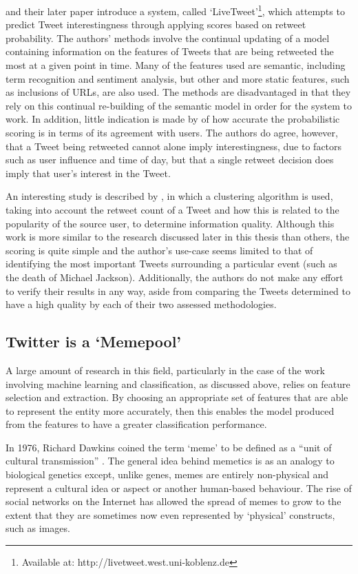 \citet{aldahi11} and their later paper \cite{aldahi12} introduce a system, called `LiveTweet'\footnote{Available at: http://livetweet.west.uni-koblenz.de}, which attempts to predict Tweet interestingness through applying scores based on retweet probability. The authors' methods involve the continual updating of a model containing information on the features of Tweets that are being retweeted the most at a given point in time. Many of the features used are semantic, including term recognition and sentiment analysis, but other and more static features, such as inclusions of URLs, are also used. The methods are disadvantaged in that they rely on this continual re-building of the semantic model in order for the system to work. In addition, little indication is made by \citet{aldahi12} of how accurate the probabilistic scoring is in terms of its agreement with users. The authors do agree, however, that a Tweet being retweeted cannot alone imply interestingness, due to factors such as user influence and time of day, but that a single retweet decision does imply that user's interest in the Tweet.

An interesting study is described by \citet{lauw10}, in which a clustering algorithm is used, taking into account the retweet count of a Tweet and how this is related to the popularity of the source user, to determine information quality. Although this work is more similar to the research discussed later in this thesis than others, the scoring is quite simple and the author's use-case seems limited to that of identifying the most important Tweets surrounding a particular event (such as the death of Michael Jackson). Additionally, the authors do not make any effort to verify their results in any way, aside from comparing the Tweets determined to have a high quality by each of their two assessed methodologies.



\subsection{Twitter is a `Memepool'}
A large amount of research in this field, particularly in the case of the work involving machine learning and classification, as discussed above, relies on feature selection and extraction. By choosing an appropriate set of features that are able to represent the entity more accurately, then this enables the model produced from the features to have a greater classification performance.  

In 1976, Richard Dawkins coined the term `meme' to be defined as a ``unit of cultural transmission'' \cite{dawkins76}. The general idea behind memetics is as an analogy to biological genetics except, unlike genes, memes are entirely non-physical and represent a cultural idea or aspect or another human-based behaviour. The rise of social networks on the Internet has allowed the spread of memes to grow to the extent that they are sometimes now even represented by `physical' constructs, such as images.


